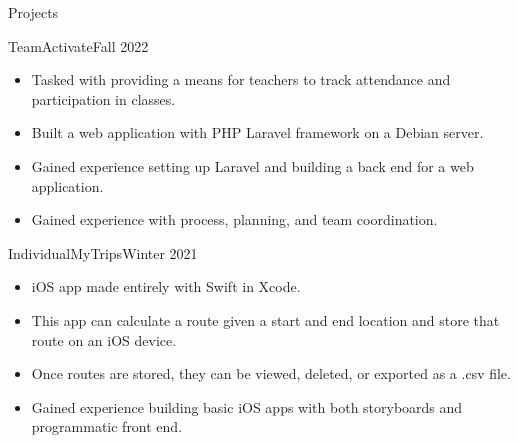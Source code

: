 \documentclass[]{mcdowellcv}
\begin{document}
  \begin{cvsection}{Projects}
    \begin{cvsubsection}{Team}{Activate}{Fall 2022}
      \begin{itemize}
        \item Tasked with providing a means for teachers to track attendance and participation in classes.
        \item Built a web application with PHP Laravel framework on a Debian server.
        \item Gained experience setting up Laravel and building a back end for a web application.
        \item Gained experience with process, planning, and team coordination.
      \end{itemize}
    \end{cvsubsection}
    \begin{cvsubsection}{Individual}{MyTrips}{Winter 2021}
      \begin{itemize}
        \item iOS app made entirely with Swift in Xcode.
        \item This app can calculate a route given a start and end location and store that route on an iOS device.
        \item Once routes are stored, they can be viewed, deleted, or exported as a .csv file.
        \item Gained experience building basic iOS apps with both storyboards and programmatic front end.
      \end{itemize}
    \end{cvsubsection}
    \iffalse
    \begin{cvsubsection}{Team}{OSV}{Fall 2019}
      \begin{itemize}
        \item Engineering design project consisting of a team of six tasked with designing an OSV (over sand vehicle) to %
        complete an obstacle course. 
        \item Designed, built, tested, and presented our solution. 
        \item I took a leadership role in the group and got very positive feedback from teammates for my contributions.
      \end{itemize}
    \end{cvsubsection}
    \fi
    \iffalse
    \begin{cvsubsection}{Team}{CCCTC Senior Project}{Fall 2018}
      \begin{itemize}
        \item Engineering design project consisting of a team of three tasked with identifying a problem, designing a solution,%
        building a product, and showcasing it.
        \item Gained experience working in a team of engineers on a semester long project.
      \end{itemize}
    \end{cvsubsection}
    \fi
  \end{cvsection}
\end{document}
